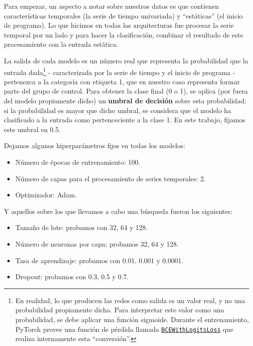 \documentclass[../../main.tex]{subfiles}
\begin{document}
Para empezar, un aspecto a notar sobre nuestros datos es que contienen características
temporales (la serie de tiempo univariada) y ``estáticas'' (el inicio de programa). Lo que
hicimos en todas las arquitecturas fue procesar la serie temporal por un lado y para hacer
la clasificación, combinar el resultado de este procesamiento con la entrada estática.

La salida de cada modelo es un número real que representa la probabilidad que la entrada
dada\footnote{En realidad, lo que producen las redes como salida es un valor real, y no
una probabilidad propiamente dicha. Para interpretar este valor como una probabilidad, se
debe aplicar una función sigmoide. Durante el entrenamiento, PyTorch provee una función de
pérdida llamada
\href{https://pytorch.org/docs/stable/generated/torch.nn.BCEWithLogitsLoss.html}{\texttt{BCEWithLogitsLoss}}
que realiza internamente esta ``conversión''.} - caracterizada por la serie de tiempo y el
inicio de programa - pertenezca a la categoría con etiqueta 1, que en nuestro caso
representa formar parte del grupo de control. Para obtener la clase final (0 o 1), se
aplica (por fuera del modelo propiamente dicho) un \textbf{umbral de decisión} sobre esta
probabilidad: si la probabilidad es mayor que dicho umbral, se considera que el modelo ha
clasificado a la entrada como pertenceciente a la clase 1. En este trabajo, fijamos este
umbral en 0.5.

Dejamos algunos hiperparámetros fijos en todas los modelos:
\begin{itemize}[itemsep=0cm, topsep=0cm, parsep=0cm, partopsep=0cm]
    \item Número de épocas de entrenamiento: 100.
    \item Número de capas para el procesamiento de series temporales: 2.
    \item Optimizador: Adam.
\end{itemize}

Y aquellos sobre los que llevamos a cabo una búsqueda fueron los siguientes:
\begin{itemize}[itemsep=0cm, topsep=0cm, parsep=0cm, partopsep=0cm]
    \item Tamaño de lote: probamos con 32, 64 y 128.
    \item Número de neuronas por capa: probamos 32, 64 y 128.
    \item Tasa de aprendizaje: probamos con 0.01, 0.001 y 0.0001.
    \item Dropout: probamos con 0.3, 0.5 y 0.7.
\end{itemize}
\end{document}
